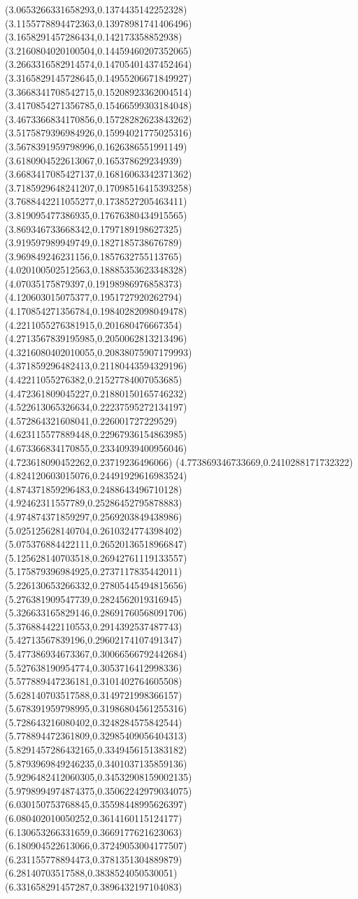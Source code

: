 {(3.0653266331658293,0.1374435142252328)
(3.1155778894472363,0.13978981741406496)
(3.1658291457286434,0.142173358852938)
(3.2160804020100504,0.14459460207352065)
(3.2663316582914574,0.14705401437452464)
(3.3165829145728645,0.14955206671849927)
(3.3668341708542715,0.15208923362004514)
(3.4170854271356785,0.15466599303184048)
(3.4673366834170856,0.15728282623843262)
(3.5175879396984926,0.15994021775025316)
(3.5678391959798996,0.1626386551991149)
(3.6180904522613067,0.165378629234939)
(3.6683417085427137,0.16816063342371362)
(3.7185929648241207,0.17098516415393258)
(3.7688442211055277,0.1738527205463411)
(3.819095477386935,0.17676380434915565)
(3.869346733668342,0.1797189198627325)
(3.919597989949749,0.1827185738676789)
(3.969849246231156,0.1857632755113765)
(4.020100502512563,0.18885353623348328)
(4.07035175879397,0.19198986976858373)
(4.120603015075377,0.1951727920262794)
(4.170854271356784,0.19840282098049478)
(4.2211055276381915,0.201680476667354)
(4.2713567839195985,0.2050062813213496)
(4.3216080402010055,0.20838075907179993)
(4.371859296482413,0.21180443594329196)
(4.42211055276382,0.21527784007053685)
(4.472361809045227,0.21880150165746232)
(4.522613065326634,0.22237595272134197)
(4.572864321608041,0.226001727229529)
(4.623115577889448,0.22967936154863985)
(4.673366834170855,0.23340939400956046)
(4.723618090452262,0.23719236496066)
(4.773869346733669,0.2410288171732322)
(4.824120603015076,0.24491929616983524)
(4.874371859296483,0.2488643496710128)
(4.92462311557789,0.25286452795878883)
(4.974874371859297,0.2569203849438986)
(5.025125628140704,0.2610324774398402)
(5.075376884422111,0.26520136518966847)
(5.125628140703518,0.26942761119133557)
(5.175879396984925,0.2737117835442011)
(5.226130653266332,0.27805445494815656)
(5.276381909547739,0.2824562019316945)
(5.326633165829146,0.28691760568091706)
(5.376884422110553,0.2914392537487743)
(5.42713567839196,0.29602174107491347)
(5.477386934673367,0.30066566792442684)
(5.527638190954774,0.3053716412998336)
(5.577889447236181,0.3101402764605508)
(5.628140703517588,0.3149721998366157)
(5.678391959798995,0.31986804561255316)
(5.728643216080402,0.3248284575842544)
(5.778894472361809,0.32985409056404313)
(5.8291457286432165,0.3349456151383182)
(5.8793969849246235,0.3401037135859136)
(5.9296482412060305,0.34532908159002135)
(5.9798994974874375,0.35062242979034075)
(6.030150753768845,0.35598448995626397)
(6.080402010050252,0.3614160115124177)
(6.130653266331659,0.3669177621623063)
(6.180904522613066,0.37249053004177507)
(6.231155778894473,0.3781351304889879)
(6.28140703517588,0.3838524050530051)
(6.331658291457287,0.3896432197104083)
}
